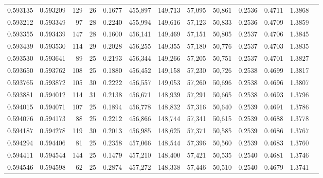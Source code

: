 \begin{tabular}{rrrrrrrrrrrrr}
0.593135 & 0.593209 &   129 &  26 &                                     0.1677 & 455,897 & 149,713 &  57,095 &  50,861 & 0.2536 & 0.4711 & 1.3868 \\
0.593212 & 0.593349 &    97 &  28 &                                     0.2240 & 455,994 & 149,616 &  57,123 &  50,833 & 0.2536 & 0.4709 & 1.3859 \\
0.593355 & 0.593439 &   147 &  28 &                                     0.1600 & 456,141 & 149,469 &  57,151 &  50,805 & 0.2537 & 0.4706 & 1.3845 \\
0.593439 & 0.593530 &   114 &  29 &                                     0.2028 & 456,255 & 149,355 &  57,180 &  50,776 & 0.2537 & 0.4703 & 1.3835 \\
0.593530 & 0.593641 &    89 &  25 &                                     0.2193 & 456,344 & 149,266 &  57,205 &  50,751 & 0.2537 & 0.4701 & 1.3827 \\
0.593650 & 0.593762 &   108 &  25 &                                     0.1880 & 456,452 & 149,158 &  57,230 &  50,726 & 0.2538 & 0.4699 & 1.3817 \\
0.593765 & 0.593872 &   105 &  30 &                                     0.2222 & 456,557 & 149,053 &  57,260 &  50,696 & 0.2538 & 0.4696 & 1.3807 \\
0.593881 & 0.594012 &   114 &  31 &                                     0.2138 & 456,671 & 148,939 &  57,291 &  50,665 & 0.2538 & 0.4693 & 1.3796 \\
0.594015 & 0.594071 &   107 &  25 &                                     0.1894 & 456,778 & 148,832 &  57,316 &  50,640 & 0.2539 & 0.4691 & 1.3786 \\
0.594076 & 0.594173 &    88 &  25 &                                     0.2212 & 456,866 & 148,744 &  57,341 &  50,615 & 0.2539 & 0.4688 & 1.3778 \\
0.594187 & 0.594278 &   119 &  30 &                                     0.2013 & 456,985 & 148,625 &  57,371 &  50,585 & 0.2539 & 0.4686 & 1.3767 \\
0.594294 & 0.594406 &    81 &  25 &                                     0.2358 & 457,066 & 148,544 &  57,396 &  50,560 & 0.2539 & 0.4683 & 1.3760 \\
0.594411 & 0.594544 &   144 &  25 &                                     0.1479 & 457,210 & 148,400 &  57,421 &  50,535 & 0.2540 & 0.4681 & 1.3746 \\
0.594546 & 0.594598 &    62 &  25 &                                     0.2874 & 457,272 & 148,338 &  57,446 &  50,510 & 0.2540 & 0.4679 & 1.3741 \\

\end{tabular}
